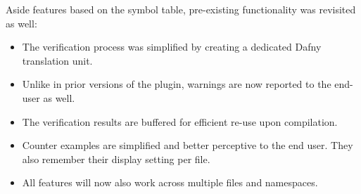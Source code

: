 Aside features based on the symbol table, pre-existing functionality was revisited as well:
\begin{itemize}
    \item The verification process was simplified by creating a dedicated Dafny translation unit.
    \item Unlike in prior versions of the plugin, warnings are now reported to the end-user as well.
    \item The verification results are buffered for efficient re-use upon compilation.
    \item Counter examples are simplified and better perceptive to the end user. They also remember their display setting per file.
    \item All features will now also work across multiple files and namespaces.
\end{itemize}